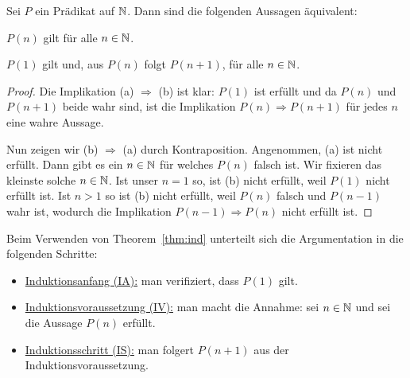 \begin{thm} \label{thm:ind}
	Sei $P$ ein Prädikat auf $\mathbb{N}$. Dann sind die folgenden Aussagen äquivalent: 
	\begin{enuma}
			\item $P(n)$ gilt für alle $n \in \mathbb{N}$. 
			\item  $P(1)$ gilt und, aus $P(n)$ folgt $P(n+1)$, für alle $n \in \mathbb{N}$. 
	\end{enuma} 
\end{thm} 
\begin{proof} 
	Die Implikation (a) $\Rightarrow$ (b) ist klar: $P(1)$ ist erfüllt und da $P(n)$ und $P(n+1)$ beide wahr sind, ist die Implikation $P(n) \Rightarrow P(n+1)$ für jedes $n$ eine wahre Aussage. 
	
	Nun zeigen wir (b) $\Rightarrow$ (a) durch Kontraposition. Angenommen, (a) ist nicht erfüllt. Dann gibt es ein $n \in \mathbb{N}$ für welches $P(n)$ falsch ist. Wir fixieren das kleinste solche $n \in \mathbb{N}$. Ist unser $n=1$ so, ist (b) nicht erfüllt, weil $P(1)$ nicht erfüllt ist. Ist $n>1$ so ist (b) nicht erfüllt, weil $P(n)$ falsch und $P(n-1)$ wahr ist, wodurch die Implikation $P(n-1) \Rightarrow P(n)$ nicht erfüllt ist. 
\end{proof} 

\begin{bem}
	Beim Verwenden von Theorem~\ref{thm:ind} unterteilt sich die Argumentation in die folgenden Schritte:
	\begin{itemize}
		\item \underline{Induktionsanfang (IA):} man verifiziert, dass $P(1)$ gilt. 
		\item \underline{Induktionsvoraussetzung (IV):} man macht die Annahme: sei $n \in \mathbb{N}$ und sei die Aussage $P(n)$ erfüllt. 
		\item \underline{Induktionsschritt (IS):} man folgert $P(n+1)$ aus der Induktionsvoraussetzung.  
	\end{itemize} 
\end{bem} 

